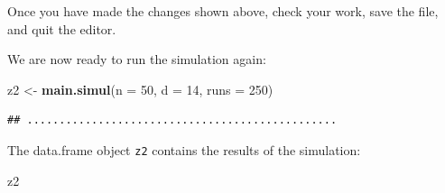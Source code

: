 \documentclass[12pt,a4paper]{book}
\newenvironment{Shaded}{\begin{snugshade}}{\end{snugshade}}
\newcommand{\KeywordTok}[1]{\textcolor[rgb]{0.13,0.29,0.53}{\textbf{#1}}}
\newcommand{\DataTypeTok}[1]{\textcolor[rgb]{0.13,0.29,0.53}{#1}}
\newcommand{\DecValTok}[1]{\textcolor[rgb]{0.00,0.00,0.81}{#1}}
\newcommand{\StringTok}[1]{\textcolor[rgb]{0.31,0.60,0.02}{#1}}
\newcommand{\NormalTok}[1]{#1}
\theoremstyle{definition}
\theoremstyle{definition}
\theoremstyle{definition}
\theoremstyle{remark}
\begin{document}
Once you have made the changes shown above, check your work, save the
file, and quit the editor.

We are now ready to run the simulation again:

\begin{Shaded}
\begin{Highlighting}[]
\NormalTok{z2 <-}\StringTok{ }\KeywordTok{main.simul}\NormalTok{(}\DataTypeTok{n =} \DecValTok{50}\NormalTok{, }\DataTypeTok{d =} \DecValTok{14}\NormalTok{, }\DataTypeTok{runs =} \DecValTok{250}\NormalTok{)}
\end{Highlighting}
\end{Shaded}

\begin{verbatim}
## ................................................
\end{verbatim}

The data.frame object \texttt{z2} contains the results of the
simulation:

\begin{Shaded}
\begin{Highlighting}[]
\NormalTok{z2}
\end{Highlighting}
\end{Shaded}
\end{document}
